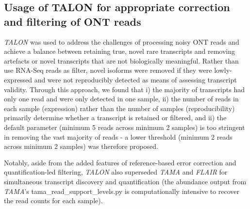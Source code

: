 \subsection{Usage of TALON for appropriate correction and filtering of ONT reads}
\textit{TALON} was used to address the challenges of processing noisy ONT reads and achieve a balance between retaining true, novel rare transcripts and removing artefacts or novel transcripts that are not biologically meaningful. Rather than use RNA-Seq reads as filter, novel isoforms were removed if they were lowly-expressed and were not reproducibly detected as means of assessing transcript validity. Through this approach, we found that i) the majority of transcripts had only one read and were only detected in one sample, ii) the number of reads in each sample (expression) rather than the number of samples (reproducibility) primarily determine whether a transcript is retained or filtered, and ii) the default parameter (minimum 5 reads across minimum 2 samples) is too stringent in removing the vast majority of reads - a lower threshold (minimum 2 reads across minimum 2 samples) was therefore proposed. 

Notably, aside from the added features of reference-based error correction and quantification-led filtering, \textit{TALON} also superseded \textit{TAMA} and \textit{FLAIR} for simultaneous transcript discovery and quantification (the abundance output from \textit{TAMA}'s tama\_read\_support\_levels.py is computationally intensive to recover the read counts for each sample). 
\resumetocwriting